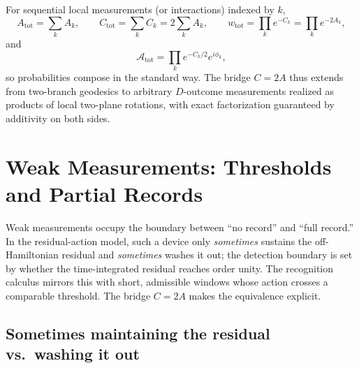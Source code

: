 \documentclass[11pt,letterpaper]{article}
\theoremstyle{definition}
\begin{document}
For sequential local measurements (or interactions) indexed by \(k\),
\begin{equation}
A_{\text{tot}}=\sum_k A_k,
\qquad
C_{\text{tot}}=\sum_k C_k=2\sum_k A_k,
\qquad
w_{\text{tot}}=\prod_k e^{-C_k}=\prod_k e^{-2A_k},
\end{equation}
and
\begin{equation}
\mathcal A_{\text{tot}}=\prod_k e^{-C_k/2}e^{i\phi_k},
\end{equation}
so probabilities compose in the standard way. The bridge \(C=2A\) thus extends from two-branch geodesics to arbitrary \(D\)-outcome measurements realized as products of local two-plane rotations, with exact factorization guaranteed by additivity on both sides.
\section{Weak Measurements: Thresholds and Partial Records}

Weak measurements occupy the boundary between ``no record'' and ``full record.'' In the residual-action model, such a device only \emph{sometimes} sustains the off-Hamiltonian residual and \emph{sometimes} washes it out; the detection boundary is set by whether the time-integrated residual reaches order unity. The recognition calculus mirrors this with short, admissible windows whose action crosses a comparable threshold. The bridge $C=2A$ makes the equivalence explicit.
\subsection{Sometimes maintaining the residual vs.\ washing it out}
\end{document}
